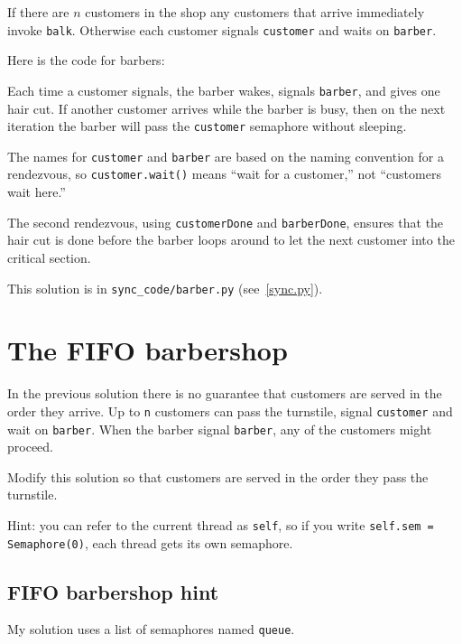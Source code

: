 \documentclass{book}
\newcommand{\clearemptydoublepage}{\newpage\cleardoublepage}
\begin{document}


If there are $n$ customers in the shop any customers that
arrive immediately invoke {\tt balk}.
Otherwise each customer signals {\tt customer} and waits on
{\tt barber}.

Here is the code for barbers:



Each time a customer signals,
the barber wakes, signals {\tt barber}, and gives one
hair cut.  If another customer arrives while the barber
is busy, then on the next iteration the barber will pass
the {\tt customer} semaphore without sleeping.

The names for {\tt customer} and {\tt barber} are based on
the naming convention for a rendezvous, so {\tt customer.wait()}
means ``wait for a customer,'' not ``customers wait here.''

The second rendezvous, using {\tt customerDone} and {\tt barberDone},
ensures that the hair cut is done before the barber loops around to
let the next customer into the critical section.

This solution is in \verb"sync_code/barber.py" (see~\ref{sync.py}).


\clearemptydoublepage
\section{The FIFO barbershop}

In the previous solution there is no guarantee that customers are
served in the order they arrive.  Up to {\tt n} customers can pass
the turnstile, signal
{\tt customer} and wait on {\tt barber}.  When the barber signal
{\tt barber}, any of the customers might proceed.

Modify this solution so that customers are served in the order they
pass the turnstile.

Hint: you can refer to the current thread as {\tt self}, so if you
write {\tt self.sem = Semaphore(0)}, each thread gets its own
semaphore.


\clearemptydoublepage
\subsection{FIFO barbershop hint}

My solution uses a list of semaphores named {\tt queue}.


\end{document}
